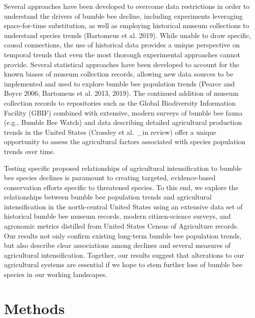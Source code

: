 \documentclass[11pt,]{article}
\begin{document}
Several approaches have been developed to overcome data restrictions in
order to understand the drivers of bumble bee decline, including
experiments leveraging space-for-time substitution, as well as employing
historical museum collections to understand species trends (Bartomeus et
al. 2019). While unable to draw specific, causal connections, the use of
historical data provides a unique perspective on temporal trends that
even the most thorough experimental approaches cannot provide. Several
statistical approaches have been developed to account for the known
biases of museum collection records, allowing new data sources to be
implemented and used to explore bumble bee population trends (Pearce and
Boyce 2006; Bartomeus et al. 2013, 2019). The continued addition of
museum collection records to repositories such as the Global
Biodiversity Information Facility (GBIF) combined with extensive, modern
surveys of bumble bee fauna (e.g., Bumble Bee Watch) and data describing
detailed agricultural production trends in the United States (Crossley
et al.~\_in review) offer a unique opportunity to assess the
agricultural factors associated with species population trends over
time.

Testing specific proposed relationships of agricultural intensification
to bumble bee species declines is paramount to creating targeted,
evidence-based conservation efforts specific to threatened species. To
this end, we explore the relationships between bumble bee population
trends and agricultural intensification in the north-central United
States using an extensive data set of historical bumble bee museum
records, modern citizen-science surveys, and agronomic metrics distilled
from United States Census of Agriculture records. Our results not only
confirm existing long-term bumble bee population trends, but also
describe clear associations among declines and several measures of
agricultural intensification. Together, our results suggest that
alterations to our agricultural systems are essential if we hope to stem
further loss of bumble bee species in our working landscapes.

\hypertarget{methods}{%
\section{Methods}\label{methods}}
\end{document}
